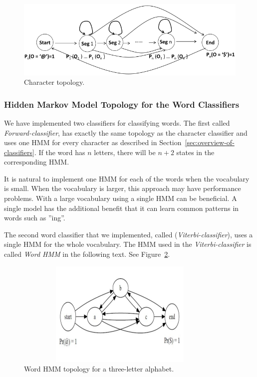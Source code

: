 \begin{figure}[h!]
\centering
\includegraphics[scale=1.1]{character-topology}
\caption{Character topology.}
\label{figure:charactertopology}
\end{figure}


\subsubsection{Hidden Markov Model Topology for the Word Classifiers}\label{sec:word_classifiers}

We have implemented two classifiers for classifying words. 
The first called \emph{Forward-classifier}, has exactly the same topology as the character classifier and uses one HMM for every character as described in Section~\ref{sec:overview-of-classifiers}. 
If the word has $n$ letters, there will be $n + 2$ states in the corresponding HMM.

It is natural to implement one HMM for each of the words when the vocabulary is small.
When the vocabulary is larger, this approach may have performance problems.
With a large vocabulary using a single HMM can be beneficial.
A single model has the additional benefit that it can learn common patterns in words such as ''ing''.

The second word classifier that we implemented, called (\emph{Viterbi-classifier}), uses a single HMM for the whole vocabulary. 
The HMM used in the \emph{Viterbi-classifier} is called \textit{Word HMM} in the following text.
See Figure~\ref{figure:wordtopology}.

\begin{figure}[h!]
\centering
\includegraphics[width=4in,height=2in]{wordtopology}
\caption{Word HMM topology for a three-letter alphabet.}
\label{figure:wordtopology}
\end{figure}

